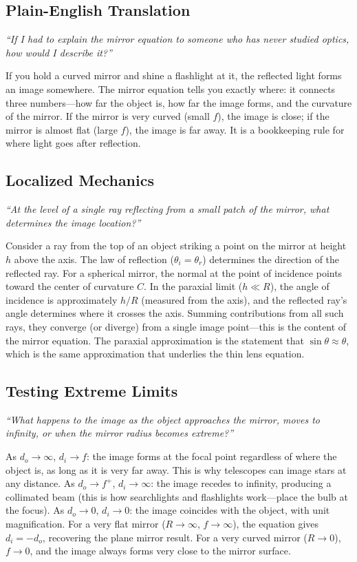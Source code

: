 \subsection*{Plain-English Translation}
\textit{``If I had to explain the mirror equation to someone who has never studied optics, how would I describe it?''}

If you hold a curved mirror and shine a flashlight at it, the reflected light forms an image somewhere. The mirror equation tells you exactly where: it connects three numbers---how far the object is, how far the image forms, and the curvature of the mirror. If the mirror is very curved (small $f$), the image is close; if the mirror is almost flat (large $f$), the image is far away. It is a bookkeeping rule for where light goes after reflection.

\subsection*{Localized Mechanics}
\textit{``At the level of a single ray reflecting from a small patch of the mirror, what determines the image location?''}

Consider a ray from the top of an object striking a point on the mirror at height $h$ above the axis. The law of reflection ($\theta_{i} = \theta_{r}$) determines the direction of the reflected ray. For a spherical mirror, the normal at the point of incidence points toward the center of curvature $C$. In the paraxial limit ($h \ll R$), the angle of incidence is approximately $h/R$ (measured from the axis), and the reflected ray's angle determines where it crosses the axis. Summing contributions from all such rays, they converge (or diverge) from a single image point---this is the content of the mirror equation. The paraxial approximation is the statement that $\sin\theta \approx \theta$, which is the same approximation that underlies the thin lens equation.

\subsection*{Testing Extreme Limits}
\textit{``What happens to the image as the object approaches the mirror, moves to infinity, or when the mirror radius becomes extreme?''}

As $d_{o} \to \infty$, $d_{i} \to f$: the image forms at the focal point regardless of where the object is, as long as it is very far away. This is why telescopes can image stars at any distance. As $d_{o} \to f^{+}$, $d_{i} \to \infty$: the image recedes to infinity, producing a collimated beam (this is how searchlights and flashlights work---place the bulb at the focus). As $d_{o} \to 0$, $d_{i} \to 0$: the image coincides with the object, with unit magnification. For a very flat mirror ($R \to \infty$, $f \to \infty$), the equation gives $d_{i} = -d_{o}$, recovering the plane mirror result. For a very curved mirror ($R \to 0$), $f \to 0$, and the image always forms very close to the mirror surface.


